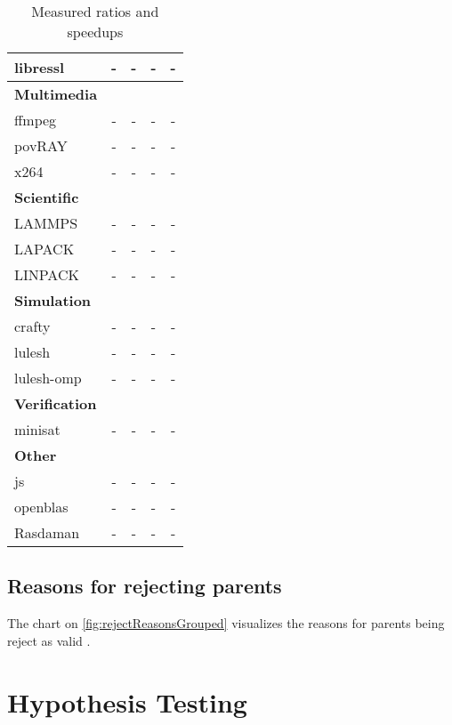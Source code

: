 \begin{table}[!ht]
{\begin{minipage}{\textwidth}
\begin{tabularx}{\textwidth}{Xcccc}
                libressl & - & - & - & -\\
                \midrule
                \textbf{Multimedia}\\
                ffmpeg & - & - & - & -\\
                povRAY & - & - & - & -\\
                x264 & - & - & - & -\\
                \midrule
                \textbf{Scientific}\\
                LAMMPS & - & - & - & -\\
                LAPACK & - & - & - & -\\
                LINPACK & - & - & - & -\\
                \midrule
                \textbf{Simulation}\\
                crafty & - & - & - & -\\
                lulesh & - & - & - & -\\
                lulesh-omp & - & - & - & -\\

                \midrule
                \textbf{Verification}\\
                minisat & - & - & - & -\\
                \midrule
                \textbf{Other}\\
                js & - & - & - & -\\
                openblas & - & - & - & -\\
                Rasdaman & - & - & - & -\\
                \bottomrule
            \end{tabularx}
            \caption{Measured ratios and speedups}
            \label{tab:ratiosAndSpeedups}
        \end{minipage}
    }
\end{table}
\subsection{Reasons for rejecting parents}
The chart on \autoref{fig:rejectReasonsGrouped} visualizes the reasons for parents being reject as valid \scops.
\section{Hypothesis Testing}

